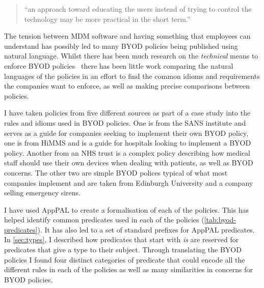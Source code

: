 \documentclass[a4paper]{scrartcl}
\begin{document}
\begin{quote}
  ``an approach toward educating the users instead of trying to control the
  technology may be more practical in the short term.''~\cite{moyer_managing_2013}
\end{quote}

The tension between \ac{MDM} software and having something that employees can
understand has possibly led to many BYOD policies being published using natural
language. Whilst there has been much research on the \emph{technical} means to
enforce BYOD
policies~\cite{martinelli_enhancing_2016,armando_enabling_2014,costantino_towards_2013}
there has been little work comparing the natural languages of the policies in an
effort to find the common idioms and requirements the companies want to enforce,
as well as making precise comparisons between policies.

I have taken policies from five different sources as part of a case study into
the rules and idioms used in BYOD policies.  One is from the SANS
institute and serves as a guide for companies seeking to implement their own
BYOD policy, one is from HiMMS and is a guide for hospitals looking to implement
a BYOD policy.  Another from an NHS trust is a complex policy describing
how medical staff should use their own devices when dealing with patients, as
well as BYOD concerns.  The other two are simple BYOD polices typical of what
most companies implement and are taken from Edinburgh University and a company
selling emergency sirens.

I have used AppPAL to create a formalisation of each of the policies. This has
helped identify common predicates used in each of the policies
(\autoref{tab:byod-predicates}). It has also led to a set of
standard prefixes for AppPAL predicates. In \autoref{sec:types}, I described how
predicates that start with \emph{is} are reserved for predicates that give a
type to their subject. Through translating the BYOD policies I found four
distinct categories of predicate that could encode all the different rules in
each of the policies as well as many similarities in concerns for BYOD
policies.
\end{document}
